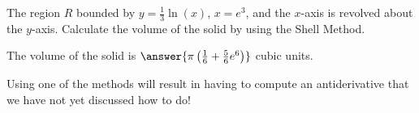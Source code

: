 \documentclass{ximera}
\author{Jim Talamo}
\begin{document}
\begin{exercise}

The region $R$ bounded by $y=\frac{1}{3} \ln(x)$, $x=e^3$, and the $x$-axis is revolved about the $y$-axis.  Calculate the volume of the solid by using the Shell Method.

The volume of the solid is $\answer{\pi\left(\frac{1}{6}+\frac{5}{6}e^6\right)}$ cubic units.	
\end{exercise}

\begin{hint}
Using one of the methods will result in having to compute an antiderivative that we have not yet discussed how to do! 
\end{hint}
\end{document}
